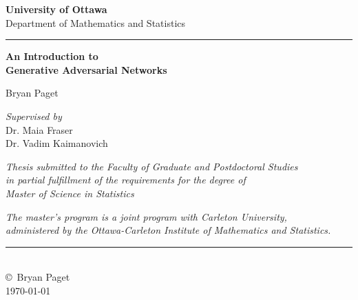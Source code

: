 \begin{titlepage}
\begin{center}
\begin{minipage}{\textwidth}
\centering
\vspace{1cm}
{\Large \textbf{University of Ottawa}} \\
\vspace{0.3cm}
{\normalsize Department of Mathematics and Statistics} \\
\vspace{0.5cm}
\rule{0.8\textwidth}{0.5pt}
\end{minipage}

\vspace{2cm}

{\Huge \bfseries An Introduction to} \\
\vspace{0.5cm}
{\Huge \bfseries Generative Adversarial Networks} \\

\vspace{3cm}

{\Large Bryan Paget} \\

\vspace{1.5cm}

{\large \textit{Supervised by}} \\
\vspace{0.5cm}
{\large Dr. Maia Fraser} \\
{\large Dr. Vadim Kaimanovich} \\

\vspace{3cm}

\begin{minipage}{0.9\textwidth}
\centering
\footnotesize \textit{Thesis submitted to the Faculty of Graduate and Postdoctoral Studies} \\
\textit{in partial fulfillment of the requirements for the degree of} \\
\textit{Master of Science in Statistics}
\end{minipage}

\vspace{1.5cm}

\footnotesize \textit{The master's program is a joint program with Carleton University,} \\
\textit{administered by the Ottawa-Carleton Institute of Mathematics and Statistics.}

\vfill

\rule{0.8\textwidth}{0.5pt} \\
\vspace{0.5cm}
{\small \copyright\ Bryan Paget} \\
{\small \today}

\end{center}
\end{titlepage}
\afterpage{\null\blankpage}

